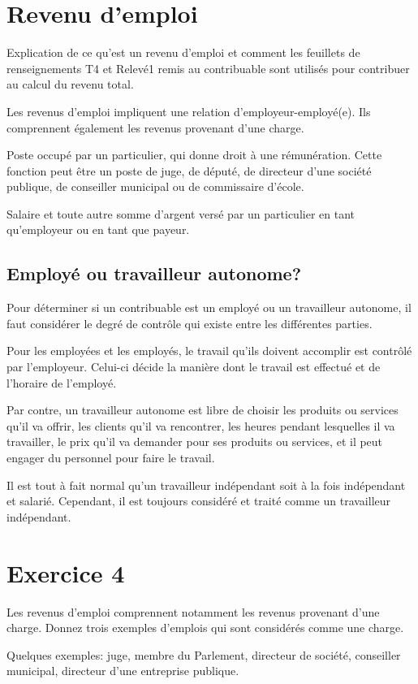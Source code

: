 \section{Revenu d'emploi}
\begin{intro}
	Explication de ce qu'est un revenu d'emploi et comment les feuillets de renseignements T4 et Relevé1 remis au contribuable sont utilisés pour contribuer au calcul du revenu total.
\end{intro}
Les revenus d'emploi impliquent une relation d'employeur-employé(e). Ils comprennent également les revenus provenant d'une charge.

\begin{description}
	\item[Charge] Poste occupé par un particulier, qui donne droit à une rémunération. Cette fonction peut être un poste de juge, de député, de directeur d'une société publique, de conseiller municipal ou de commissaire d'école.
	\item[Rémunération] Salaire et toute autre somme d'argent versé par un particulier en tant qu'employeur ou en tant que payeur.
\end{description}


\subsection{Employé ou travailleur autonome?}
Pour déterminer si un contribuable est un employé ou un travailleur autonome, il faut considérer le degré de contrôle qui existe entre les différentes parties.

Pour les employées et les employés, le travail qu'ils doivent accomplir est contrôlé par l'employeur. Celui-ci décide la manière dont le travail est effectué et de l'horaire de l'employé.  

Par contre, un travailleur autonome est libre de choisir les produits ou services qu'il va offrir, les clients qu'il va rencontrer, les heures pendant lesquelles il va travailler, le prix qu'il va demander pour ses produits ou services, et il peut engager du personnel pour faire le travail.
\begin{note}
	Il est tout à fait normal qu'un travailleur indépendant soit à la fois indépendant et salarié. Cependant, il est toujours considéré et traité comme un travailleur indépendant.
\end{note}



\section{Exercice 4}
\setcounter{question}{0}
\begin{question}
	Les revenus d'emploi comprennent notamment les revenus provenant d'une charge. Donnez trois exemples d'emplois qui sont considérés comme une charge.
\end{question}
Quelques exemples: juge, membre du Parlement, directeur de société, conseiller municipal, directeur d'une entreprise publique.

